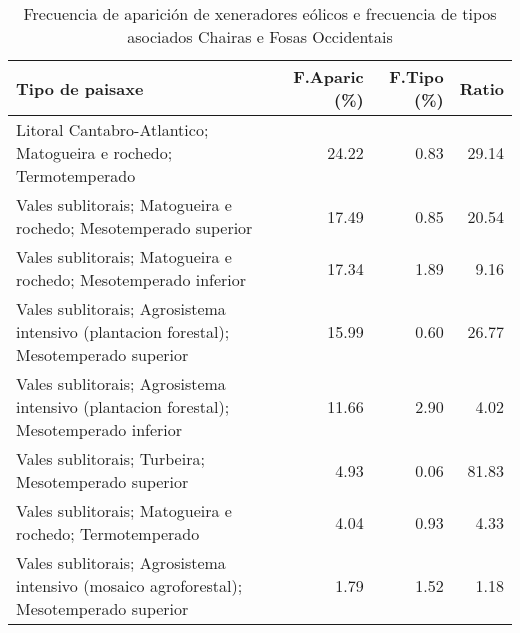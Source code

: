 \begin{table}[p]
\centering
\caption{Frecuencia de aparición de xeneradores eólicos e frecuencia de tipos asociados Chairas e Fosas Occidentais} 
\label{veolico11}
\begin{tabular}{lrrr}
  \hline
Tipo de paisaxe & F.Aparic (\%) & F.Tipo (\%) & Ratio \\ 
  \hline
Litoral Cantabro-Atlantico; Matogueira e rochedo; Termotemperado & 24.22 & 0.83 & 29.14 \\ 
  Vales sublitorais; Matogueira e rochedo; Mesotemperado superior & 17.49 & 0.85 & 20.54 \\ 
  Vales sublitorais; Matogueira e rochedo; Mesotemperado inferior & 17.34 & 1.89 & 9.16 \\ 
  Vales sublitorais; Agrosistema intensivo (plantacion forestal); Mesotemperado superior & 15.99 & 0.60 & 26.77 \\ 
  Vales sublitorais; Agrosistema intensivo (plantacion forestal); Mesotemperado inferior & 11.66 & 2.90 & 4.02 \\ 
  Vales sublitorais; Turbeira; Mesotemperado superior & 4.93 & 0.06 & 81.83 \\ 
  Vales sublitorais; Matogueira e rochedo; Termotemperado & 4.04 & 0.93 & 4.33 \\ 
  Vales sublitorais; Agrosistema intensivo (mosaico agroforestal); Mesotemperado superior & 1.79 & 1.52 & 1.18 \\ 
   \hline
\end{tabular}
\end{table}
